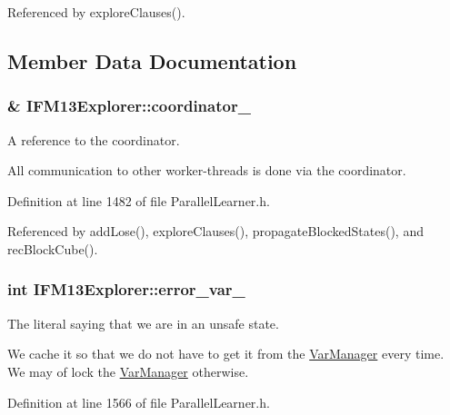 Referenced by explore\-Clauses().



\subsection{Member Data Documentation}
\hypertarget{classIFM13Explorer_aff7fd95615eb7508a22b6b4992061678}{
\subsubsection[{coordinator\-\_\-}]{\& I\-F\-M13\-Explorer\-::coordinator\-\_\-\hspace{0.3cm}{\ttfamily [protected]}}}\label{classIFM13Explorer_aff7fd95615eb7508a22b6b4992061678}


A reference to the coordinator. 

All communication to other worker-\/threads is done via the coordinator. 

Definition at line 1482 of file Parallel\-Learner.\-h.



Referenced by add\-Lose(), explore\-Clauses(), propagate\-Blocked\-States(), and rec\-Block\-Cube().

\hypertarget{classIFM13Explorer_a222a8be4c6ce2e54488aabb9b882f8c9}{
\subsubsection[{error\-\_\-var\-\_\-}]{\setlength{\rightskip}{0pt plus 5cm}int I\-F\-M13\-Explorer\-::error\-\_\-var\-\_\-\hspace{0.3cm}{\ttfamily [protected]}}}\label{classIFM13Explorer_a222a8be4c6ce2e54488aabb9b882f8c9}


The literal saying that we are in an unsafe state. 

We cache it so that we do not have to get it from the \hyperlink{classVarManager}{Var\-Manager} every time. We may of lock the \hyperlink{classVarManager}{Var\-Manager} otherwise. 

Definition at line 1566 of file Parallel\-Learner.\-h.




